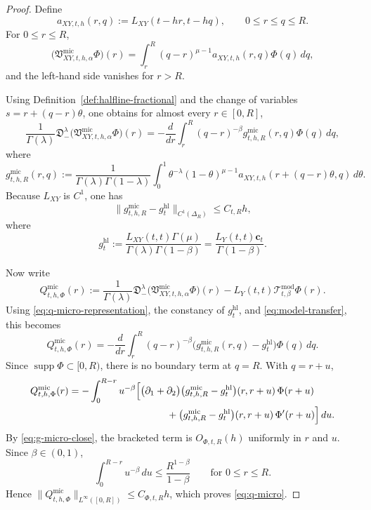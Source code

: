\documentclass[11pt,a4paper]{amsart}
\theoremstyle{plain}
\theoremstyle{definition}
\theoremstyle{remark}
\begin{document}
\begin{proof}
Define
\[
a_{XY,t,h}(r,q):=L_{XY}(t-hr,t-hq),
\qquad
0\le r\le q\le R.
\]
For \(0\le r\le R\),
\[
\bigl(
\mathfrak V_{XY,t,h,\alpha}^{\mathrm{mic}}\Phi
\bigr)(r)
=
\int_r^R (q-r)^{\mu-1}a_{XY,t,h}(r,q)\Phi(q)\,dq,
\]
and the left-hand side vanishes for \(r>R\).

Using Definition~\ref{def:halfline-fractional} and the change of variables
\(s=r+(q-r)\theta\), one obtains for almost every \(r\in[0,R]\),
\begin{equation}\label{eq:q-micro-representation}
\frac{1}{\Gamma(\lambda)}
\mathfrak D_-^\lambda
\bigl(
\mathfrak V_{XY,t,h,\alpha}^{\mathrm{mic}}\Phi
\bigr)(r)
=
-\frac{d}{dr}
\int_r^R (q-r)^{-\beta}g_{t,h,R}^{\mathrm{mic}}(r,q)\Phi(q)\,dq,
\end{equation}
where
\[
g_{t,h,R}^{\mathrm{mic}}(r,q)
:=
\frac{1}{\Gamma(\lambda)\Gamma(1-\lambda)}
\int_0^1
\theta^{-\lambda}(1-\theta)^{\mu-1}
a_{XY,t,h}(r+(q-r)\theta,q)\,d\theta.
\]
Because \(L_{XY}\) is \(C^1\), one has
\begin{equation}\label{eq:g-micro-close}
\bigl\|
g_{t,h,R}^{\mathrm{mic}}-g_{t}^{\mathrm{hl}}
\bigr\|_{C^1(\Delta_R)}
\le
C_{t,R}h,
\end{equation}
where
\[
g_t^{\mathrm{hl}}
:=
\frac{L_{XY}(t,t)\Gamma(\mu)}{\Gamma(\lambda)\Gamma(1-\beta)}
=
\frac{L_Y(t,t)\mathbf c_t}{\Gamma(1-\beta)}.
\]

Now write
\[
Q_{t,h,\Phi}^{\mathrm{mic}}(r)
:=
\frac{1}{\Gamma(\lambda)}
\mathfrak D_-^\lambda
\bigl(
\mathfrak V_{XY,t,h,\alpha}^{\mathrm{mic}}\Phi
\bigr)(r)
-L_Y(t,t)\mathcal T_{t,\beta}^{\mathrm{mod}}\Phi(r).
\]
Using \eqref{eq:q-micro-representation}, the constancy of \(g_t^{\mathrm{hl}}\), and
\eqref{eq:model-transfer}, this becomes
\[
Q_{t,h,\Phi}^{\mathrm{mic}}(r)
=
-\frac{d}{dr}
\int_r^R
(q-r)^{-\beta}
\bigl(
g_{t,h,R}^{\mathrm{mic}}(r,q)-g_t^{\mathrm{hl}}
\bigr)\Phi(q)\,dq.
\]
Since \(\operatorname{supp}\Phi\subset [0,R)\), there is no boundary term at \(q=R\). With \(q=r+u\),
\begin{align*}
Q_{t,h,\Phi}^{\mathrm{mic}}(r)
&=
-\int_0^{R-r} u^{-\beta}
\Bigl[
\bigl(\partial_1+\partial_2\bigr)
\bigl(
g_{t,h,R}^{\mathrm{mic}}-g_t^{\mathrm{hl}}
\bigr)(r,r+u)\,\Phi(r+u) \\
&\qquad\qquad\qquad\qquad\qquad
+\bigl(
g_{t,h,R}^{\mathrm{mic}}-g_t^{\mathrm{hl}}
\bigr)(r,r+u)\,\Phi'(r+u)
\Bigr]\,du.
\end{align*}
By \eqref{eq:g-micro-close}, the bracketed term is \(O_{\Phi,t,R}(h)\) uniformly in \(r\) and
\(u\). Since \(\beta\in(0,1)\),
\[
\int_0^{R-r} u^{-\beta}\,du\le \frac{R^{1-\beta}}{1-\beta}
\qquad\text{for }0\le r\le R.
\]
Hence \(\|Q_{t,h,\Phi}^{\mathrm{mic}}\|_{L^\infty([0,R])}\le C_{\Phi,t,R}h\), which proves
\eqref{eq:q-micro}.
\end{proof}
\end{document}
